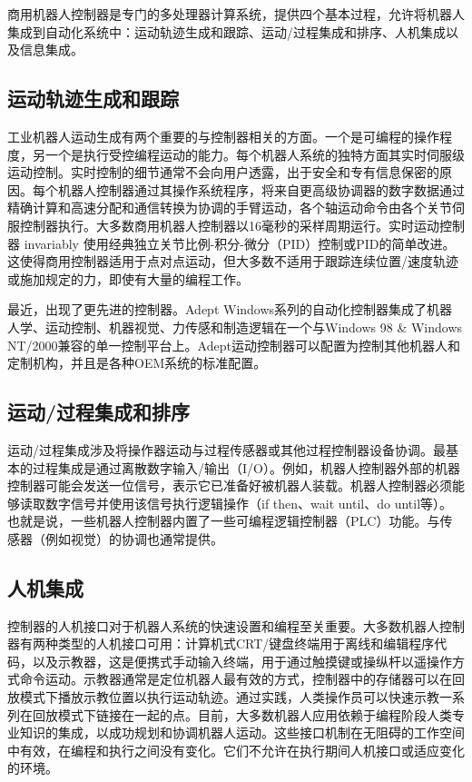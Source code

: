 \documentclass[UTF8,a4paper]{ctexart}
\begin{document}
商用机器人控制器是专门的多处理器计算系统，提供四个基本过程，允许将机器人集成到自动化系统中：运动轨迹生成和跟踪、运动/过程集成和排序、人机集成以及信息集成。

\subsection{运动轨迹生成和跟踪}

工业机器人运动生成有两个重要的与控制器相关的方面。一个是可编程的操作程度，另一个是执行受控编程运动的能力。每个机器人系统的独特方面其实时伺服级运动控制。实时控制的细节通常不会向用户透露，出于安全和专有信息保密的原因。每个机器人控制器通过其操作系统程序，将来自更高级协调器的数字数据通过精确计算和高速分配和通信转换为协调的手臂运动，各个轴运动命令由各个关节伺服控制器执行。大多数商用机器人控制器以16毫秒的采样周期运行。实时运动控制器 invariably 使用经典独立关节比例-积分-微分（PID）控制或PID的简单改进。这使得商用控制器适用于点对点运动，但大多数不适用于跟踪连续位置/速度轨迹或施加规定的力，即使有大量的编程工作。

最近，出现了更先进的控制器。Adept Windows系列的自动化控制器集成了机器人学、运动控制、机器视觉、力传感和制造逻辑在一个与Windows 98 \& Windows NT/2000兼容的单一控制平台上。Adept运动控制器可以配置为控制其他机器人和定制机构，并且是各种OEM系统的标准配置。

\subsection{运动/过程集成和排序}

运动/过程集成涉及将操作器运动与过程传感器或其他过程控制器设备协调。最基本的过程集成是通过离散数字输入/输出（I/O）。例如，机器人控制器外部的机器控制器可能会发送一位信号，表示它已准备好被机器人装载。机器人控制器必须能够读取数字信号并使用该信号执行逻辑操作（if then、wait until、do until等）。也就是说，一些机器人控制器内置了一些可编程逻辑控制器（PLC）功能。与传感器（例如视觉）的协调也通常提供。

\subsection{人机集成}

控制器的人机接口对于机器人系统的快速设置和编程至关重要。大多数机器人控制器有两种类型的人机接口可用：计算机式CRT/键盘终端用于离线和编辑程序代码，以及示教器，这是便携式手动输入终端，用于通过触摸键或操纵杆以遥操作方式命令运动。示教器通常是定位机器人最有效的方式，控制器中的存储器可以在回放模式下播放示教位置以执行运动轨迹。通过实践，人类操作员可以快速示教一系列在回放模式下链接在一起的点。目前，大多数机器人应用依赖于编程阶段人类专业知识的集成，以成功规划和协调机器人运动。这些接口机制在无阻碍的工作空间中有效，在编程和执行之间没有变化。它们不允许在执行期间人机接口或适应变化的环境。
\end{document}
